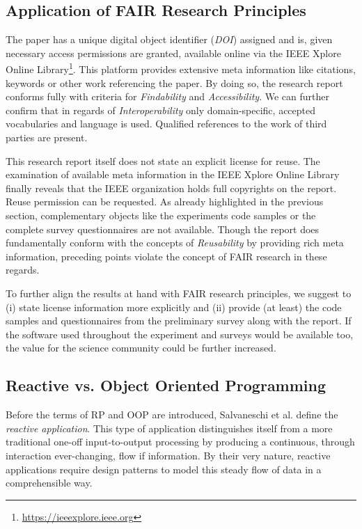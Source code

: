 \documentclass[12pt,a4paper]{article}
\begin{document}
\subsection{Application of FAIR Research Principles}

The paper has a unique digital object identifier (\emph{DOI}) assigned and is, given necessary access permissions are granted, available online via the IEEE Xplore Online Library\footnote{\url{https://ieeexplore.ieee.org}}. This platform provides extensive meta information like citations, keywords or other work referencing the paper. By doing so, the research report conforms fully with criteria for \emph{Findability} and \emph{Accessibility}. We can further confirm that in regards of \emph{Interoperability} only domain-specific, accepted vocabularies and language is used. Qualified references to the work of third parties are present.

This research report itself does not state an explicit license for reuse. The examination of available meta information in the IEEE Xplore Online Library finally reveals that the IEEE organization holds full copyrights on the report. Reuse permission can be requested. As already highlighted in the previous section, complementary objects like the experiments code samples or the complete survey questionnaires are not available. Though the report does fundamentally conform with the concepts of \emph{Reusability} by providing rich meta information, preceding points violate the concept of FAIR research in these regards.

To further align the results at hand with FAIR research principles, we suggest to (i) state license information more explicitly and (ii) provide (at least) the code samples and questionnaires from the preliminary survey along with the report. If the software used throughout the experiment and surveys would be available too, the value for the science community could be further increased.

\subsection{Reactive vs. Object Oriented Programming}

Before the terms of RP and OOP are introduced, Salvaneschi et al. define the \emph{reactive application}. This type of application distinguishes itself from a more traditional one-off input-to-output processing by producing a continuous, through interaction ever-changing, flow if information. By their very nature, reactive applications require design patterns to model this steady flow of data in a comprehensible way.
\end{document}

